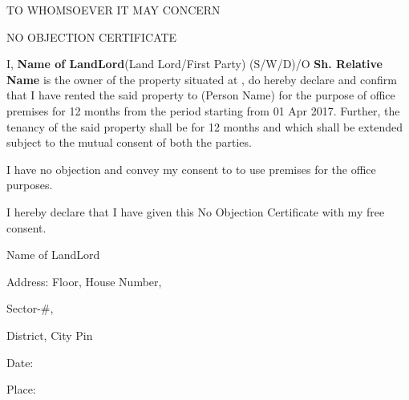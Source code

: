 \documentclass[a4paper,11pt] {report}
\begin{document}
\vspace*{2cm}
\bigskip
{\bf \centerline{TO WHOMSOEVER IT MAY CONCERN}}
\bigskip

{\bf \centerline{NO OBJECTION CERTIFICATE}}
\bigskip

I, {\bf{Name of LandLord}}(Land Lord/First Party) (S/W/D)/O
{\bf{Sh. Relative Name}} is the owner of the property situated at
\underline{\myaddress}, do hereby declare and confirm that I have
rented the said property to {\bf{\myname}}(Person Name) for the
purpose of office premises for 12 months from the period starting from
01 Apr 2017. Further, the tenancy of the said property shall be for 12
months and which shall be extended subject to the mutual consent of
both the parties.

I have no objection and convey my consent to {\bf{\myname}} to use
premises for the office purposes.
        
I hereby declare that I have given this No Objection Certificate with
my free consent.
\bigskip

Name of LandLord

Address: Floor, House Number,

Sector-\#,

District, City Pin

Date: \DayAfter[0]

\bigskip
Place: \myplace \newline
\end{document}
